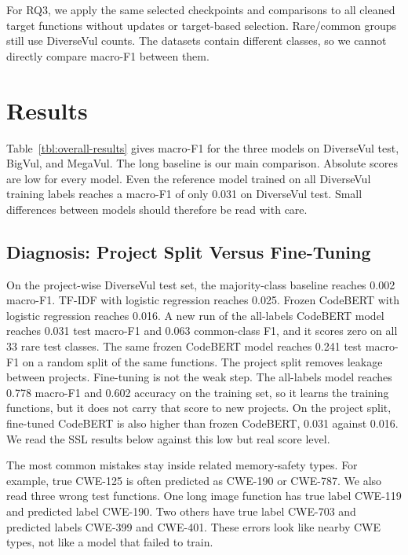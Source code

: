 \documentclass[conference]{IEEEtran}
\begin{document}
For RQ3, we apply the same selected checkpoints and comparisons to all
cleaned target functions without updates or target-based selection.
Rare/common groups still use DiverseVul counts. The datasets contain
different classes, so we cannot directly compare macro-F1 between them.

\section{Results}\label{results}

Table~\ref{tbl:overall-results} gives macro-F1 for the three models on
DiverseVul test, BigVul, and MegaVul. The long baseline is our main
comparison. Absolute scores are low for every model. Even the reference
model trained on all DiverseVul training labels reaches a macro-F1 of
only 0.031 on DiverseVul test. Small differences between models should
therefore be read with care.

\subsection{Diagnosis: Project Split Versus
Fine-Tuning}\label{diagnosis-project-split-versus-fine-tuning}

On the project-wise DiverseVul test set, the majority-class baseline reaches 0.002 macro-F1. TF-IDF with logistic regression reaches 0.025. Frozen CodeBERT with logistic regression reaches 0.016. A new run of the all-labels CodeBERT model reaches 0.031 test macro-F1 and 0.063 common-class F1, and it scores zero on all 33 rare test classes. The same frozen CodeBERT model reaches 0.241 test macro-F1 on a random split of the same functions. The project split removes leakage between projects. Fine-tuning is not the weak step. The all-labels model reaches 0.778 macro-F1 and 0.602 accuracy on the training set, so it learns the training functions, but it does not carry that score to new projects. On the project split, fine-tuned CodeBERT is also higher than frozen CodeBERT, 0.031 against 0.016. We read the SSL results below against this low but real score level.

The most common mistakes stay inside related memory-safety types. For example, true CWE-125 is often predicted as CWE-190 or CWE-787. We also read three wrong test functions. One long image function has true label CWE-119 and predicted label CWE-190. Two others have true label CWE-703 and predicted labels CWE-399 and CWE-401. These errors look like nearby CWE types, not like a model that failed to train.
\end{document}
